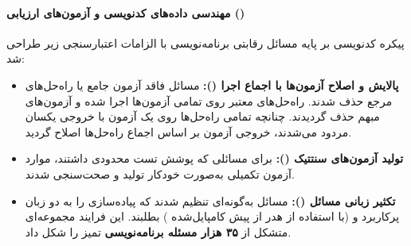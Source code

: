 \begin{table}[htbp]
\centering
\caption{مراحل پالایش و حجم دادگان آموزش ریاضی مدل }
\label{tab:magistral_math_filter}
\end{table}

\paragraph*{مهندسی داده‌های کدنویسی و آزمون‌های ارزیابی ()}
پیکره کدنویسی بر پایه مسائل رقابتی برنامه‌نویسی با الزامات اعتبارسنجی زیر طراحی شد:
\begin{itemize}
    \item \textbf{پالایش و اصلاح آزمون‌ها با اجماع اجرا ():} مسائل فاقد آزمون جامع یا راه‌حل‌های مرجع حذف شدند. راه‌حل‌های معتبر روی تمامی آزمون‌ها اجرا شده و آزمون‌های مبهم حذف گردیدند. چنانچه تمامی راه‌حل‌ها روی یک آزمون با خروجی یکسان مردود می‌شدند، خروجی آزمون بر اساس اجماع راه‌حل‌ها اصلاح گردید.
    \item \textbf{تولید آزمون‌های سنتتیک ():} برای مسائلی که پوشش تست محدودی داشتند، موارد آزمون تکمیلی به‌صورت خودکار تولید و صحت‌سنجی شدند.
    \item \textbf{تکثیر زبانی مسائل ():} مسائل به‌گونه‌ای تنظیم شدند که پیاده‌سازی را به دو زبان پرکاربرد  و  (با استفاده از هدر از پیش کامپایل‌شده ) بطلبند. این فرایند مجموعه‌ای متشکل از \textbf{۳۵ هزار مسئله برنامه‌نویسی} تمیز را شکل داد.
\end{itemize}

